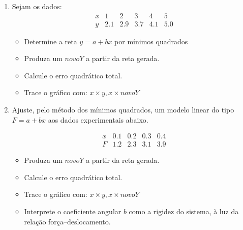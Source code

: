 \begin{enumerate}
\section{Ajuste de curvas} \label{sec:ajusteCurvas}

\subsection{Regressão linear}
\item Sejam os dados:
\[
\begin{array}{c|ccccc}
x & 1 & 2 & 3 & 4 & 5 \\
y & 2.1 & 2.9 & 3.7 & 4.1 & 5.0
\end{array}
\]
\begin{itemize}
    \item Determine a reta $y = a + bx$ por mínimos quadrados 
    \item Produza um $novoY$ a partir da reta gerada.
    \item Calcule o erro quadrático total.
    \item Trace o gráfico com: $ x \times y , x \times novoY$ 
\end{itemize}


\item Ajuste, pelo método dos mínimos quadrados, um modelo linear do tipo $F = a + bx$ aos dados experimentais abaixo. 


\[
    \begin{array}{c|cccc}
        x & 0.1 & 0.2 & 0.3 & 0.4 \\
        F & 1.2 & 2.3 & 3.1 & 3.9
    \end{array}
    \]
    
\begin{itemize}
    \item Produza um $novoY$ a partir da reta gerada.
    \item Calcule o erro quadrático total.
    \item Trace o gráfico com: $ x \times y , x \times novoY$ 
    \item Interprete o coeficiente angular $b$ como a rigidez do sistema, à luz da relação força--deslocamento.
\end{itemize}



\end{enumerate}
